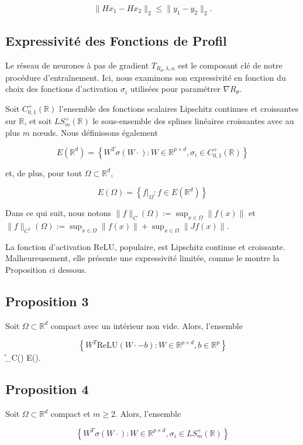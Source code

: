 \documentclass[a4paper, 12pt]{report} %
\begin{document}
\[
\| Hx_1 - Hx_2 \|_2 \leq \| y_1 - y_2 \|_2.
\]
\subsection{Expressivité des Fonctions de Profil}
Le réseau de neurones à pas de gradient \( T_{R_\theta,\lambda,\alpha} \) est le composant clé de notre procédure d'entraînement. Ici, nous examinons son expressivité en fonction du choix des fonctions d'activation \( \sigma_i \) utilisées pour paramétrer \( \nabla R_\theta \).

Soit \( C_{0,1}^+(\mathbb{R}) \) l'ensemble des fonctions scalaires Lipschitz continues et croissantes sur \( \mathbb{R} \), et soit \( LS_m^+(\mathbb{R}) \) le sous-ensemble des splines linéaires croissantes avec au plus \( m \) nœuds. Nous définissons également

\[
E(\mathbb{R}^d) = \left\{ W^T \sigma(W \cdot) : W \in \mathbb{R}^{p \times d}, \sigma_i \in C_{0,1}^+(\mathbb{R}) \right\} 
\]

et, de plus, pour tout \( \Omega \subset \mathbb{R}^d \),

\[
E(\Omega) = \left\{ f|_{\Omega} : f \in E(\mathbb{R}^d) \right\} 
\]

Dans ce qui suit, nous notons \( \|f\|_C(\Omega) := \sup_{x \in \Omega} \|f(x)\| \) et \( \|f\|_{C^1}(\Omega) := \sup_{x \in \Omega} \|f(x)\| + \sup_{x \in \Omega} \|Jf(x)\| \).

La fonction d'activation ReLU, populaire, est Lipschitz continue et croissante. Malheureusement, elle présente une expressivité limitée, comme le montre la Proposition ci dessous.
\subsection*{Proposition 3}
Soit \( \Omega \subset \mathbb{R}^d \) compact avec un intérieur non vide. Alors, l'ensemble 

\[
\left\{ W^T \text{ReLU}(W \cdot - b) : W \in \mathbb{R}^{p \times d}, b \in \mathbb{R}^p \right\}
\]
 \| \cdot \|_C(\Omega)  E(\Omega).
\subsection*{Proposition 4}
Soit \( \Omega \subset \mathbb{R}^d \) compact et \( m \geq 2 \). Alors, l'ensemble 

\[
\left\{ W^T \sigma(W \cdot) : W \in \mathbb{R}^{p \times d}, \sigma_i \in LS_m^+(\mathbb{R}) \right\} 
\]
\end{document}

